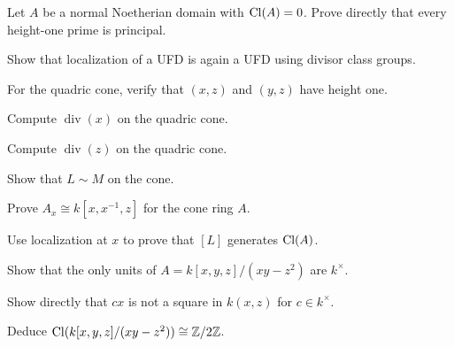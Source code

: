 \begin{exercise}\label{exr:vi41-05}
Let \(A\) be a normal Noetherian domain with \(\operatorname{Cl}(A)=0\). Prove directly that every height-one prime is principal.
\end{exercise}

\begin{exercise}\label{exr:vi41-06}
Show that localization of a UFD is again a UFD using divisor class groups.
\end{exercise}

\begin{exercise}\label{exr:vi41-07}
For the quadric cone, verify that \((x,z)\) and \((y,z)\) have height one.
\end{exercise}

\begin{exercise}\label{exr:vi41-08}
Compute \(\operatorname{div}(x)\) on the quadric cone.
\end{exercise}

\begin{exercise}\label{exr:vi41-09}
Compute \(\operatorname{div}(z)\) on the quadric cone.
\end{exercise}

\begin{exercise}\label{exr:vi41-10}
Show that \(L\sim M\) on the cone.
\end{exercise}

\begin{exercise}\label{exr:vi41-11}
Prove \(A_x\cong k[x,x^{-1},z]\) for the cone ring \(A\).
\end{exercise}

\begin{exercise}\label{exr:vi41-12}
Use localization at \(x\) to prove that \([L]\) generates \(\operatorname{Cl}(A)\).
\end{exercise}

\begin{exercise}\label{exr:vi41-13}
Show that the only units of \(A=k[x,y,z]/(xy-z^2)\) are \(k^\times\).
\end{exercise}

\begin{exercise}\label{exr:vi41-14}
Show directly that \(cx\) is not a square in \(k(x,z)\) for \(c\in k^\times\).
\end{exercise}

\begin{exercise}\label{exr:vi41-15}
Deduce \(\operatorname{Cl}(k[x,y,z]/(xy-z^2))\cong\mathbb Z/2\mathbb Z\).
\end{exercise}

